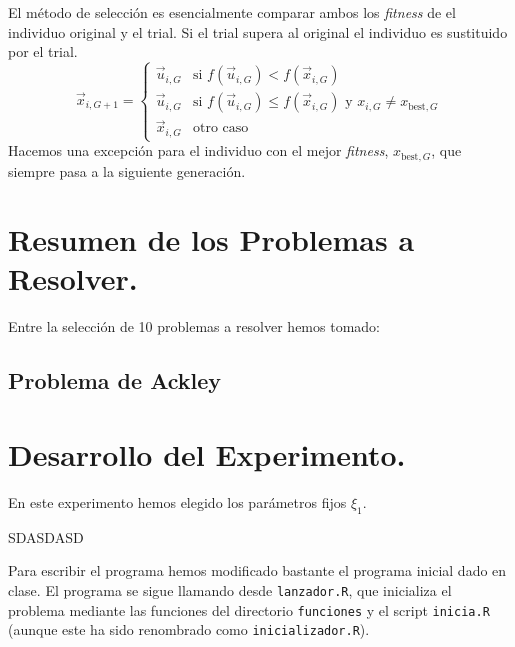 \documentclass{article}
\begin{document}
El método de selección es esencialmente comparar ambos los \textit{fitness} de el individuo original y el trial. Si el trial supera al original el individuo es sustituido por el trial.
\begin{equation}
    \vec{x}_{i,G+1} = \left\{\begin{array}{cl}
            \vec{u}_{i,G}&\text{si }f(\vec{u}_{i,G})<f(\vec{x}_{i,G})\\
            \vec{u}_{i,G}&\text{si }f(\vec{u}_{i,G})\le f(\vec{x}_{i,G})\text{ y }x_{i, G}\neq x_{\text{best}, G}\\
            \vec{x}_{i,G}&\text{otro caso}
        \end{array}\right.
\label{ec_seleccion}
\end{equation}
Hacemos una excepción para el individuo con el mejor \textit{fitness}, $x_{\text{best},G}$, que siempre pasa a la siguiente generación.

\section{Resumen de los Problemas a Resolver.}
Entre la selección de 10 problemas a resolver hemos tomado:

\subsection{Problema de Ackley}

\section{Desarrollo del Experimento.}
En este experimento hemos elegido los parámetros fijos $\xi_{1}$. 

SDASDASD

Para escribir el programa hemos modificado bastante el programa inicial dado en clase. El programa se sigue llamando desde \texttt{lanzador.R}, que inicializa el problema mediante las funciones del directorio \texttt{funciones} y el script \texttt{inicia.R} (aunque este ha sido renombrado como \texttt{inicializador.R}).
\end{document}
